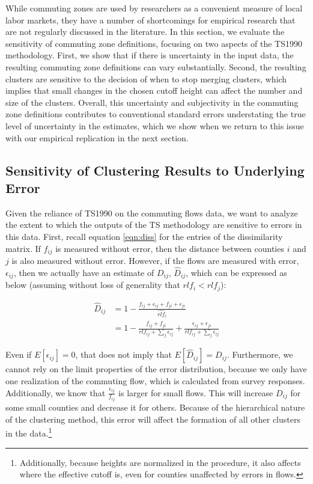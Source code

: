While commuting zones are used by researchers as a convenient measure of local labor markets, they have a number of shortcomings for empirical research that are not regularly discussed in the literature. In this section, we evaluate the sensitivity of commuting zone definitions, focusing on two aspects of the TS1990 methodology. First, we show that if there is uncertainty in the input data, the resulting commuting zone definitions can vary substantially. Second, the resulting clusters are sensitive to the decision of when to stop merging clusters, which implies that small changes in the chosen cutoff height can affect the number and size of the clusters. Overall, this uncertainty and subjectivity in the commuting zone definitions contributes to conventional standard errors understating the true level of uncertainty in the estimates, which we show when we return to this issue with our empirical replication in the next section.

\subsection{Sensitivity of Clustering Results to Underlying Error}

Given the reliance of TS1990 on the commuting flows data, we want to analyze the extent to which the outputs of the TS methodology are sensitive to errors in this data. First, recall equation \ref{eqn:diss} for the entries of the dissimilarity matrix. If $f_{ij}$ is measured without error, then the distance between counties $i$ and $j$ is also measured without error. However, if the flows are measured with error, $\epsilon_{ij}$, then we actually have an estimate of $D_{ij}$, $\hat{D}_{ij}$, which can be expressed as below (assuming without loss of generality that $rlf_i < rlf_j$):


\begin{align*}
\hat{D}_{ij} &= 1 - \frac{f_{ij} + \epsilon_{ij} + f_{ji} + \epsilon_{ji}}{\hat{rlf}_i} \\
&= 1- \frac{f_{ij} + f_{ji}}{rlf_{ij} + \sum_j \epsilon_{ij}} +  \frac{\epsilon_{ij} + \epsilon_{ji}}{rlf_{ij} + \sum_j \epsilon_{ij}}
\end{align*}

Even if $E[\epsilon_{ij}]=0$, that does not imply that $E[\hat{D}_{ij}] = D_{ij}$. Furthermore, we cannot rely on the limit properties of the error distribution, because we only have one realization of the commuting flow, which is calculated from survey responses. Additionally, we know that $\frac{\epsilon_{ij}}{f_{ij}}$ is larger for small flows. This will increase $D_{ij}$ for some small counties and decrease it for others. Because of the hierarchical nature of the clustering method, this error will affect the formation of all other clusters in the data.\footnote{Additionally, because heights are normalized in the procedure, it also affects where the effective cutoff is, even for counties unaffected by errors in flows.}

